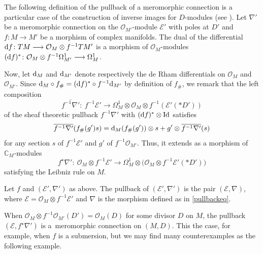 \documentclass[10pt,a4paper]{amsart}
\numberwithin{equation}{section}
\begin{document}
The following definition of the pullback of a meromorphic connection is a particular case of the construction of inverse images for $D$-modules (see \cite[p.~21]{Hotta}). Let $\nabla'$ be a meromorphic connection on the $\mathcal{O}_{M'}$-module $\mathcal{E}'$ with poles at $D'$ and $f\colon M\longrightarrow M'$ be a morphism of complex manifolds. The dual of the differential ${\rm d}f\colon TM \longrightarrow \mathcal{O}_M \otimes f^{-1}TM'$ is a morphism of $\mathcal{O}_M$-modules $({\rm d}f)^* \colon \mathcal{O}_M \otimes f^{-1} \Omega^1_{M'} \longrightarrow \Omega^1_M$.


Now, let ${\rm d}_M$ and ${\rm d}_{M'}$ denote respectively the de Rham differentials on $\mathcal{O}_M$ and $\mathcal{O}_{M'}$. Since ${\rm d}_M \circ f_\# = ({\rm d}f)^* \circ f^{-1} {\rm d}_{M'}$ by definition of $f_\#$, we remark that the left composition
\[\overline{f^{-1}\nabla'}\colon\ f^{-1}\mathcal{E}' \longrightarrow \Omega^1_M \otimes \mathcal{O}_M \otimes f^{-1}(\mathcal{E}'(* D'))\]
 of the sheaf theoretic pullback $f^{-1}\nabla'$ with $({\rm d}f)^*\otimes {\rm Id}$ satisfies
 \begin{equation}\label{nablabar} \overline{f^{-1}\nabla'}(f_\#(g')s) = {\rm d}_M(f_\#(g')) \otimes s + g' \otimes \overline{f^{-1}\nabla'}(s) \end{equation}
 for any section $s$ of $f^{-1}\mathcal{E}'$ and $g'$ of $f^{-1}\mathcal{O}_{M'}$. Thus, it extends as a morphism of $\mathbb{C}_{M}$-modules
 \begin{equation}\label{pullbackeq} f^\star \nabla' \colon \ \mathcal{O}_M\otimes f^{-1}\mathcal{E}' \longrightarrow \Omega^1_M \otimes \big(\mathcal{O}_M\otimes f^{-1}\mathcal{E}'(* D')\big) \end{equation}
 satisfying the Leibniz rule on $M$.

\begin{Definition}\label{pullback}Let $f$ and $(\mathcal{E}',\nabla')$ as above. The pullback of $(\mathcal{E}',\nabla')$ is the pair $(\mathcal{E},\nabla)$, where $\mathcal{E}=\mathcal{O}_M \otimes f^{-1}\mathcal{E}'$ and $\nabla$ is the morphism defined as in \eqref{pullbackeq}. \end{Definition}

When $\mathcal{O}_M\otimes f^{-1}\mathcal{O}_{M'}(D') = \mathcal{O}_M(D)$ for some divisor $D$ on $M$, the pullback $(\mathcal{E},f^\star \nabla')$ is a~meromorphic connection on $(M,D)$. This the case, for example, when $f$ is a submersion, but we may find many counterexamples as the following example.
\end{document}
